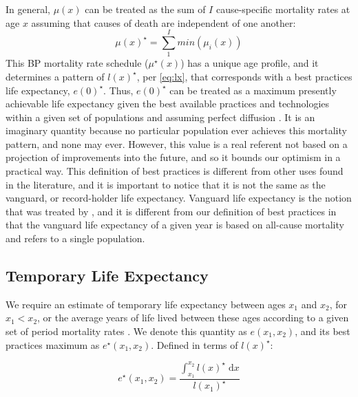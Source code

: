 \documentclass{article}
\newcommand{\dd}{\; \mathrm{d}}
\begin{document}
In general, $\mu(x)$ can be treated as the sum of $I$ cause-specific mortality
rates at age $x$ assuming that causes of death are independent of one another:
\begin{equation}
\label{eq:mxmin}
\mu(x)^{\star} = \sum_1^I min(\mu_i(x))
\end{equation}
This BP mortality rate schedule ($\mu^{\star}(x)$) has a unique
age profile, and it determines a pattern of $l(x)^{\star}$, per \eqref{eq:lx}, that corresponds with a
best practices life expectancy, $e(0)^{\star}$. Thus, $e(0)^{\star}$ can be treated as a
maximum presently achievable life expectancy given the best available
practices and technologies within a given set of populations and assuming
perfect diffusion \citep{vallin2008minimum}. It is an imaginary quantity because no particular population
ever achieves this mortality pattern, and none may ever. However, this value is
a real referent not based on a projection of improvements into the future, and
so it bounds our optimism in a practical way. This definition of best practices
is different from other uses found in the literature, and it is important to
notice that it is not the same as the vanguard, or record-holder life
expectancy. Vanguard life expectancy is the notion that was treated by
\citet{oeppen2002broken}, and it is different from our definition of best
practices in that the vanguard life expectancy of a given year is based on
all-cause mortality and refers to a single population.

\subsection*{Temporary Life Expectancy}

We require an estimate of temporary life expectancy between ages
$x_1$ and $x_2$, for $x_1<x_2$, or the average years of life lived between these ages according to a given set of period mortality rates \citep{arriaga1984}. We denote this quantity as
$e(x_1,x_2)$, and its best practices maximum as $e^{\star}(x_1,x_2)$. Defined in
terms of $l(x)^\star$:

\begin{equation}
e^{\star}(x_1,x_2) = \frac{\int _{x_1}^{x_2} l(x)^\star \dd x}{l(x_1)^\star}
\end{equation}
\end{document}
